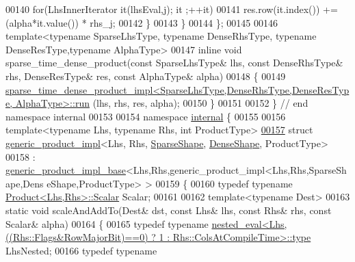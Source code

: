 \begin{DoxyCode}
00140       \textcolor{keywordflow}{for}(LhsInnerIterator it(lhsEval,j); it ;++it)
00141         res.row(it.index()) += (alpha*it.value()) * rhs\_j;
00142     \}
00143   \}
00144 \};
00145 
00146 \textcolor{keyword}{template}<\textcolor{keyword}{typename} SparseLhsType, \textcolor{keyword}{typename} DenseRhsType, \textcolor{keyword}{typename} DenseResType,\textcolor{keyword}{typename} AlphaType>
00147 \textcolor{keyword}{inline} \textcolor{keywordtype}{void} sparse\_time\_dense\_product(\textcolor{keyword}{const} SparseLhsType& lhs, \textcolor{keyword}{const} DenseRhsType& rhs, DenseResType& res,
       \textcolor{keyword}{const} AlphaType& alpha)
00148 \{
00149   
      \hyperlink{struct_eigen_1_1internal_1_1sparse__time__dense__product__impl}{sparse\_time\_dense\_product\_impl<SparseLhsType,DenseRhsType,DenseResType, AlphaType>::run}
      (lhs, rhs, res, alpha);
00150 \}
00151 
00152 \} \textcolor{comment}{// end namespace internal}
00153 
00154 \textcolor{keyword}{namespace }\hyperlink{namespaceinternal}{internal} \{
00155 
00156 \textcolor{keyword}{template}<\textcolor{keyword}{typename} Lhs, \textcolor{keyword}{typename} Rhs, \textcolor{keywordtype}{int} ProductType>
\hyperlink{struct_eigen_1_1internal_1_1generic__product__impl_3_01_lhs_00_01_rhs_00_01_sparse_shape_00_01_d233f0596d1aaf62fecbcef5d636a2696}{00157} \textcolor{keyword}{struct }\hyperlink{struct_eigen_1_1internal_1_1generic__product__impl}{generic\_product\_impl}<Lhs, Rhs, \hyperlink{struct_eigen_1_1_sparse_shape}{SparseShape}, 
      \hyperlink{struct_eigen_1_1_dense_shape}{DenseShape}, ProductType>
00158  : \hyperlink{struct_eigen_1_1internal_1_1generic__product__impl__base}{generic\_product\_impl\_base}<Lhs,Rhs,generic\_product\_impl<Lhs,Rhs,SparseShape,Dens
      eShape,ProductType> >
00159 \{
00160   \textcolor{keyword}{typedef} \textcolor{keyword}{typename} \hyperlink{group___core___module_class_eigen_1_1_product}{Product<Lhs,Rhs>::Scalar} Scalar;
00161   
00162   \textcolor{keyword}{template}<\textcolor{keyword}{typename} Dest>
00163   \textcolor{keyword}{static} \textcolor{keywordtype}{void} scaleAndAddTo(Dest& dst, \textcolor{keyword}{const} Lhs& lhs, \textcolor{keyword}{const} Rhs& rhs, \textcolor{keyword}{const} Scalar& alpha)
00164   \{
00165     \textcolor{keyword}{typedef} \textcolor{keyword}{typename} 
      \hyperlink{class_eigen_1_1internal_1_1_tensor_lazy_evaluator_writable}{nested\_eval<Lhs,((Rhs::Flags&RowMajorBit)==0) ? 1 : Rhs::ColsAtCompileTime>::type}
       LhsNested;
00166     \textcolor{keyword}{typedef} \textcolor{keyword}{typename} 

\end{DoxyCode}
